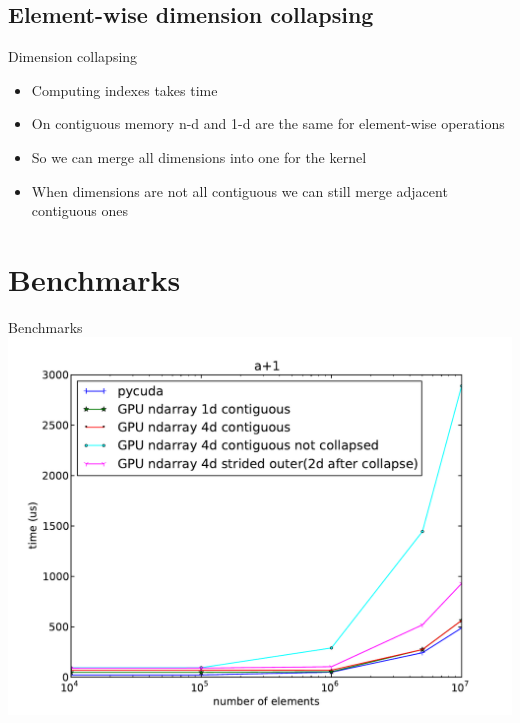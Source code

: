 \documentclass[utf8x,xcolor=pdftex,dvipsnames,table]{beamer}
\begin{document}
\subsection{Element-wise dimension collapsing}
\begin{frame}{Dimension collapsing}
\begin{itemize}
\item Computing indexes takes time
\item On contiguous memory n-d and 1-d are the same for element-wise operations
\item So we can merge all dimensions into one for the kernel
\item When dimensions are not all contiguous we can still merge adjacent contiguous ones
\end{itemize}
\end{frame}

\section{Benchmarks}
\begin{frame}{Benchmarks}
\includegraphics[width=\textwidth]{ap1_no_alloc}
\end{frame}
\end{document}
